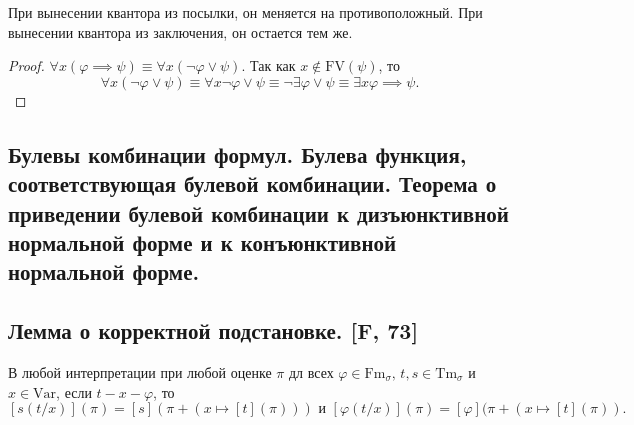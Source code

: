 \documentclass[a4paper, fleqn]{article}
\begin{document}
    При вынесении квантора из посылки, он меняется на противоположный.
    При вынесении квантора из заключения, он остается тем же.
    
    \begin{proof}
        $\forall x (\varphi \implies \psi) \equiv \forall x (\neg \varphi \lor \psi)$.
        Так как $x \notin \text{FV}(\psi)$, то
        $$
            \forall x (\neg \varphi \lor \psi) \equiv \forall x \neg \varphi \lor 
            \psi \equiv \neg \exists \varphi \lor \psi \equiv \exists x \varphi 
            \implies \psi.
        $$
    \end{proof}

    \subsection{Булевы комбинации формул. Булева функция, соответствующая булевой комбинации. Теорема о приведении булевой комбинации к дизъюнктивной нормальной форме и к конъюнктивной нормальной форме.}

    \subsection{Лемма о корректной подстановке. [F, 73]}
    \begin{lemma} В любой интерпретации при любой оценке $\pi$ дл всех $\varphi \in \text{Fm}_{\sigma}, \, t, s \in \text{Tm}_{\sigma}$ и $x \in \text{Var}$, если $t-x-\varphi$, то
    \[ [s(t/x)](\pi) = [s](\pi + (x \mapsto [t](\pi))) \text{ и } [\varphi(t/x)](\pi) = [\varphi](\pi + (x \mapsto [t](\pi)). \]
    \end{lemma}
    
\end{document}
